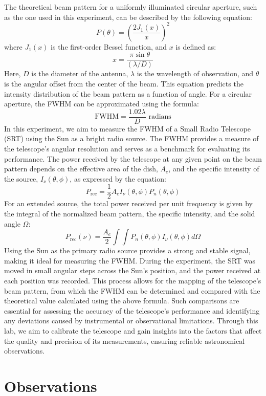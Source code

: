 \documentclass[linenumbers,twocolumn]{aastex631}
\begin{document}
The theoretical beam pattern for a uniformly illuminated circular aperture, such as the one used in this experiment, can be described by the following equation:
\begin{equation}
    P(\theta) = \left( \frac{2J_1(x)}{x} \right)^2
\end{equation}
where \( J_1(x) \) is the first-order Bessel function, and \( x \) is defined as:
\[
x = \frac{\pi \sin{\theta}}{(\lambda / D)}
\]
Here, \( D \) is the diameter of the antenna, \( \lambda \) is the wavelength of observation, and \( \theta \) is the angular offset from the center of the beam. This equation predicts the intensity distribution of the beam pattern as a function of angle. For a circular aperture, the FWHM can be approximated using the formula:
\[
\text{FWHM} = \frac{1.02 \lambda}{D} \text{ radians}
\]
In this experiment, we aim to measure the FWHM of a Small Radio Telescope (SRT) using the Sun as a bright radio source. The FWHM provides a measure of the telescope’s angular resolution and serves as a benchmark for evaluating its performance. The power received by the telescope at any given point on the beam pattern depends on the effective area of the dish, \( A_e \), and the specific intensity of the source, \( I_{\nu}(\theta, \phi) \), as expressed by the equation:
\[
P_{\text{rec}} = \frac{1}{2} A_e I_{\nu}(\theta, \phi) P_n(\theta, \phi)
\]
For an extended source, the total power received per unit frequency is given by the integral of the normalized beam pattern, the specific intensity, and the solid angle \( \Omega \):
\[
P_{\text{rec}}(\nu) = \frac{A_e}{2} \int \int P_n(\theta, \phi) I_{\nu}(\theta, \phi) d\Omega
\]
Using the Sun as the primary radio source provides a strong and stable signal, making it ideal for measuring the FWHM. During the experiment, the SRT was moved in small angular steps across the Sun’s position, and the power received at each position was recorded. This process allows for the mapping of the telescope’s beam pattern, from which the FWHM can be determined and compared with the theoretical value calculated using the above formula. Such comparisons are essential for assessing the accuracy of the telescope’s performance and identifying any deviations caused by instrumental or observational limitations. Through this lab, we aim to calibrate the telescope and gain insights into the factors that affect the quality and precision of its measurements, ensuring reliable astronomical observations.

\section{Observations} \label{sec:observations}
\end{document}
